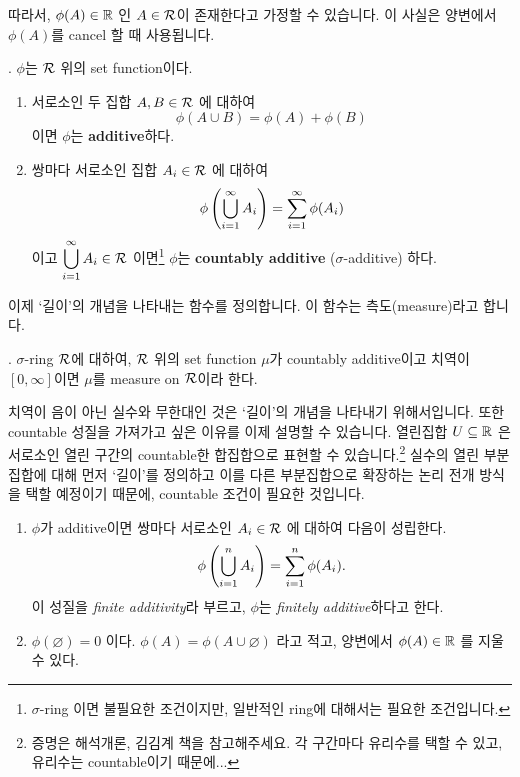 따라서, \(\phi(A) \in \mathbb{R}\) 인 \(A \in \mathcal{R}\)이 존재한다고 가정할 수 있습니다. 이 사실은 양변에서 \(\phi(A)\)를 cancel 할 때 사용됩니다.

. \(\phi\)는 \(\mathcal{R}\) 위의 set function이다.
\begin{enumerate}
    \item 서로소인 두 집합 \(A, B \in \mathcal{R}\) 에 대하여
          \[
              \phi(A\cup B) = \phi(A) + \phi(B)
          \]
          이면 \(\phi\)는 \textbf{additive}하다.

    \item 쌍마다 서로소인 집합 \(A_i \in \mathcal{R}\) 에 대하여
          \[
              \phi\left( \bigcup_{i=1}^\infty A_i \right) = \sum_{i=1}^\infty \phi(A_i)
          \]
          이고 \(\displaystyle \bigcup_{i=1}^\infty A_i \in \mathcal{R}\) 이면\footnote{\(\sigma\)-ring 이면 불필요한 조건이지만, 일반적인 ring에 대해서는 필요한 조건입니다.} \(\phi\)는 \textbf{countably additive} (\(\sigma\)-additive) 하다.
\end{enumerate}

이제 `길이'의 개념을 나타내는 함수를 정의합니다. 이 함수는 측도(measure)라고 합니다.

.  \(\sigma\)-ring \(\mathcal{R}\)에 대하여, \(\mathcal{R}\) 위의 set function \(\mu\)가 countably additive이고 치역이 \([0, \infty]\)이면 \(\mu\)를 measure on \(\mathcal{R}\)이라 한다.

치역이 음이 아닌 실수와 무한대인 것은 `길이'의 개념을 나타내기 위해서입니다. 또한 countable 성질을 가져가고 싶은 이유를 이제 설명할 수 있습니다. 열린집합 \(U \subseteq \mathbb{R}\) 은 서로소인 열린 구간의 countable한 합집합으로 표현할 수 있습니다.\footnote{증명은 해석개론, 김김계 책을 참고해주세요. 각 구간마다 유리수를 택할 수 있고, 유리수는 countable이기 때문에...} 실수의 열린 부분집합에 대해 먼저 `길이'를 정의하고 이를 다른 부분집합으로 확장하는 논리 전개 방식을 택할 예정이기 때문에, countable 조건이 필요한 것입니다.

\medskip

\rmk
\begin{enumerate}
    \item \(\phi\)가 additive이면 쌍마다 서로소인 \(A_i \in \mathcal{R}\) 에 대하여 다음이 성립한다.
          \[
              \phi\left( \bigcup_{i=1}^n A_i \right) = \sum_{i=1}^n \phi(A_i).
          \]
          이 성질을 \textit{finite additivity}라 부르고, \(\phi\)는 \textit{finitely additive}하다고 한다.

    \item \(\phi(\varnothing) = 0\) 이다. \(\phi(A) = \phi(A \cup \varnothing)\) 라고 적고, 양변에서 \(\phi(A) \in \mathbb{R}\) 를 지울 수 있다.
\end{enumerate}

